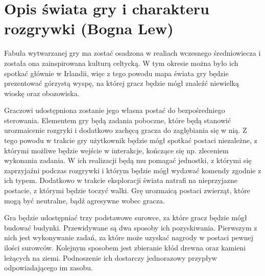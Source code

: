 \section{Opis świata gry i charakteru rozgrywki (Bogna Lew)}\label{s:swiat}
Fabuła wytwarzanej gry ma zostać osadzona w realiach wczesnego średniowiecza i została ona zainspirowana kulturą celtycką.
W tym okresie można było ich spotkać głównie w Irlandii, więc z tego powodu mapa świata gry będzie prezentować górzystą wyspę, na
której gracz będzie mógł znaleźć niewielką wioskę oraz obozowiska.

Graczowi udostępniona zostanie jego własna postać do bezpośredniego sterowania. Elementem gry będą zadania
poboczne, które będą stanowić urozmaicenie rozgryki i dodatkowo zachęcą gracza do
zagłębiania się w nią. Z tego powodu w trakcie gry użytkownik będzie mógł spotkać postaci niezależne, z którymi możliwe
będzie wejście w interakcje, kończące się np. zleceniem wykonania zadania. W ich realizacji będą mu pomagać jednostki,
z którymi się zaprzyjaźni podczas rozgrywki i którym będzie mógł wydawać komendy zgodnie z ich typem. Dodatkowo w
trakcie eksploracji świata natrafi na nieprzyjazne postacie, z którymi będzie toczyć walki. Grę urozmaicą postaci
zwierząt, które mogą być neutralne, bądź agresywne wobec gracza.

Gra będzie udostępniać trzy podstawowe surowce, za które gracz będzie mógł budować budynki. Przewidywane są dwa sposoby
ich pozyskiwania. Pierwszym z nich jest wykonywanie zadań, za które może uzyskać nagrody w postaci pewnej ilości
surowców. Kolejnym sposobem jest zbieranie kłód drewna oraz kamieni leżących na ziemi. Podnoszenie ich dostarczy
jednorazowy przypływ odpowiadającego im zasobu.
